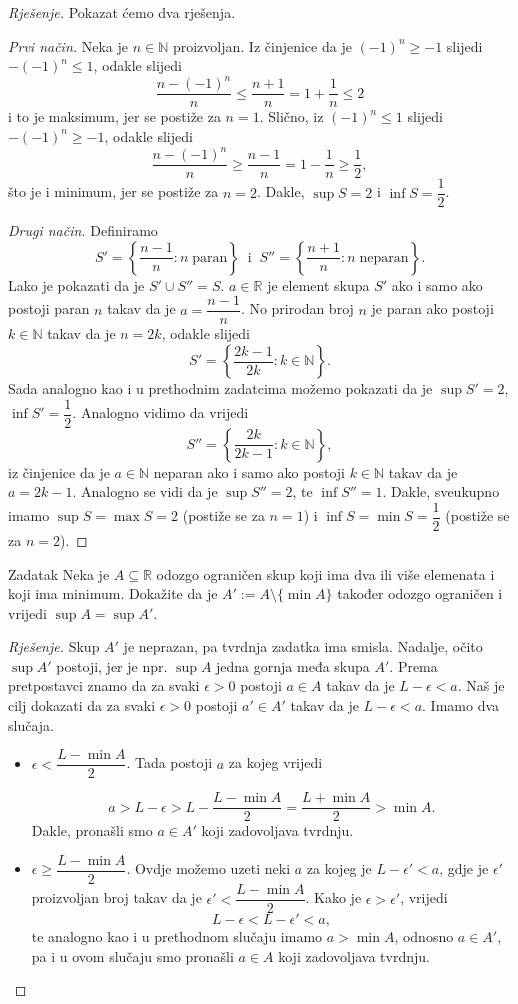 \begin{proof}[Rješenje]
Pokazat ćemo dva rješenja.

\textit{Prvi način.} Neka je \(n\in \mathbb{N}\) proizvoljan. Iz činjenice da je \((-1)^n\geq -1\) slijedi \(-(-1)^n\leq 1\), odakle slijedi
\[\dfrac{n-(-1)^n}{n}\leq \dfrac{n+1}{n}=1+\dfrac{1}{n}\leq 2\]
i to je maksimum, jer se postiže za \(n=1\). Slično, iz \((-1)^n\leq 1\) slijedi \(-(-1)^n\geq -1\), odakle slijedi
\[\dfrac{n-(-1)^n}{n}\geq \dfrac{n-1}{n}=1-\dfrac{1}{n}\geq \dfrac{1}{2},\]
što je i minimum, jer se postiže za \(n=2\). Dakle, \(\sup{S}=2\) i \(\inf{S}=\dfrac{1}{2}\).

\textit{Drugi način.} Definiramo
\[S'=\left\{\dfrac{n-1}{n} : n \;\mathrm{paran}\right\}\;\;\text{i}\;\;S''=\left\{\dfrac{n+1}{n} : n \;\mathrm{neparan}\right\}.\] Lako je pokazati da je \(S'\cup S''=S\). \(a\in \mathbb{R}\) je element skupa \(S'\) ako i samo ako postoji paran \(n\) takav da je \(a=\dfrac{n-1}{n}\). No prirodan broj \(n\) je paran ako postoji \(k\in \mathbb{N}\) takav da je \(n=2k\), odakle slijedi \[S'=\left\{\dfrac{2k-1}{2k} : k\in \mathbb{N}\right\}.\] Sada analogno kao i u prethodnim zadatcima možemo pokazati da je \(\sup{S'}=2\), \(\inf{S'}=\dfrac{1}{2}\). Analogno vidimo da vrijedi \[S''=\left\{\dfrac{2k}{2k-1} : k\in \mathbb{N}\right\},\] iz činjenice da je \(a\in \mathbb{N}\) neparan ako i samo ako postoji \(k\in \mathbb{N}\) takav da je \(a=2k-1\). Analogno se vidi da je \(\sup{S''}=2\), te \(\inf{S''}=1\). Dakle, sveukupno imamo \(\sup{S}=\max{S}=2\) (postiže se za $n=1$) i \(\inf{S}=\min{S}=\dfrac{1}{2}\) (postiže se za $n=2$).
\end{proof}
\begin{exercise}{Zadatak}
Neka je \(A\subseteq \mathbb{R}\) odozgo ograničen skup koji ima dva ili više elemenata i koji ima minimum. Dokažite da je \(A':=A\setminus \{\min{A}\}\) također odozgo ograničen i vrijedi \(\sup{A}=\sup{A'}\).
\end{exercise}
\begin{proof}[Rješenje]
Skup \(A'\) je neprazan, pa tvrdnja zadatka ima smisla. Nadalje, očito \(\sup{A'}\) postoji, jer je npr. \(\sup{A}\) jedna gornja međa skupa \(A'\). Prema pretpostavci znamo da za svaki \(\epsilon>0\) postoji \(a\in A\) takav da je \(L-\epsilon<a\). Naš je cilj dokazati da za svaki \(\epsilon>0\) postoji \(a'\in A'\) takav da je \(L-\epsilon<a\). Imamo dva slučaja.
\begin{itemize}
\item \(\epsilon<\dfrac{L-\min{A}}{2}\). Tada postoji \(a\) za kojeg vrijedi

\[a>L-\epsilon>L-\dfrac{L-\min{A}}{2}=\dfrac{L+\min{A}}{2}>\min{A}.\]
Dakle, pronašli smo \(a\in A'\) koji zadovoljava tvrdnju.
\item \(\epsilon\geq \dfrac{L-\min{A}}{2}\). Ovdje možemo uzeti neki \(a\) za kojeg je \(L-\epsilon'<a\), gdje je \(\epsilon'\) proizvoljan broj takav da je \(\epsilon'<\dfrac{L-\min{A}}{2}\). Kako je \(\epsilon>\epsilon'\), vrijedi
\[L-\epsilon<L-\epsilon'<a,\]
te analogno kao i u prethodnom slučaju imamo \(a>\min{A}\), odnosno \(a\in A'\), pa i u ovom slučaju smo pronašli \(a\in A\) koji zadovoljava tvrdnju. \qedhere
\end{itemize}
\end{proof}
